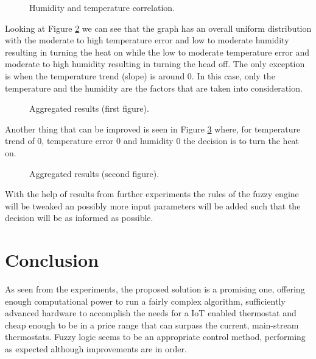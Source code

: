 \documentclass[conference]{IEEEtran}
\let\Oldsection\section
\renewcommand{\section}{\FloatBarrier\Oldsection}
\begin{document}
\begin{figure}[h!]
\label{fig:humidex}
\centerline{}
      \caption[Humidity and temperature correlation]{Humidity and temperature correlation.}
\label{fig:humidex}
\end{figure}

Looking at Figure \ref{fig:result1} we can see that the graph has an overall uniform distribution with the
moderate to high temperature error and low to moderate humidity resulting in turning the heat on while
the low to moderate temperature error and moderate to high humidity resulting in turning the head off.
The only exception is when the temperature trend (slope) is around 0. In this case, only the temperature and
the humidity are the factors that are taken into consideration.

\begin{figure}[h!]
\label{fig:result1}
\centerline{}
      \caption[Aggregated results (first figure).]{Aggregated results (first figure).}
\label{fig:result1}
\end{figure}

Another thing that can be improved is seen in Figure \ref{fig:result2} where, for temperature trend of 0,
temperature error 0 and humidity 0 the decision is to turn the heat on.
\begin{figure}[h!]
\label{fig:result2}
\centerline{}
      \caption[Aggregated results (second figure).]{Aggregated results (second figure).}
\label{fig:result2}
\end{figure}

With the help of results from further experiments the rules of the fuzzy engine will be tweaked an possibly
more input parameters will be added such that the decision will be as informed as possible.

\section{Conclusion}
\label{Conclusion}

As seen from the experiments, the proposed solution is a promising one, offering enough computational power
to run a fairly complex algorithm, sufficiently advanced hardware to accomplish the needs for a IoT enabled
thermostat and cheap enough to be in a price range that can surpass the current, main-stream thermostats.
Fuzzy logic seems to be an appropriate control method, performing as expected although improvements are in
order.



\end{document}
